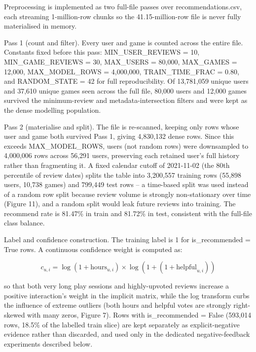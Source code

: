 \documentclass[conference]{IEEEtran}
\begin{document}
Preprocessing is implemented as two full-file passes over recommendations.csv, each streaming 1-million-row chunks so the 41.15-million-row file is never fully materialised in memory.

Pass 1 (count and filter). Every user and game is counted across the entire file. Constants fixed before this pass: MIN\_USER\_REVIEWS = 10, MIN\_GAME\_REVIEWS = 30, MAX\_USERS = 80,000, MAX\_GAMES = 12,000, MAX\_MODEL\_ROWS = 4,000,000, TRAIN\_TIME\_FRAC = 0.80, and RANDOM\_STATE = 42 for full reproducibility. Of 13,781,059 unique users and 37,610 unique games seen across the full file, 80,000 users and 12,000 games survived the minimum-review and metadata-intersection filters and were kept as the dense modelling population.

Pass 2 (materialise and split). The file is re-scanned, keeping only rows whose user and game both survived Pass 1, giving 4,830,132 dense rows. Since this exceeds MAX\_MODEL\_ROWS, users (not random rows) were downsampled to 4,000,006 rows across 56,291 users, preserving each retained user's full history rather than fragmenting it. A fixed calendar cutoff of 2021-11-02 (the 80th percentile of review dates) splits the table into 3,200,557 training rows (55,898 users, 10,738 games) and 799,449 test rows -- a time-based split was used instead of a random row split because review volume is strongly non-stationary over time (Figure 11), and a random split would leak future reviews into training. The recommend rate is 81.47\% in train and 81.72\% in test, consistent with the full-file class balance.

Label and confidence construction. The training label is 1 for is\_recommended = True rows. A continuous confidence weight is computed as:

\begin{equation}
c_{u,i} = \log(1 + \mathrm{hours}_{u,i}) \times \log(1 + (1 + \mathrm{helpful}_{u,i})) 
\end{equation}

so that both very long play sessions and highly-upvoted reviews increase a positive interaction's weight in the implicit matrix, while the log transform curbs the influence of extreme outliers (both hours and helpful votes are strongly right-skewed with many zeros, Figure 7). Rows with is\_recommended = False (593,014 rows, 18.5\% of the labelled train slice) are kept separately as explicit-negative evidence rather than discarded, and used only in the dedicated negative-feedback experiments described below.
\end{document}
